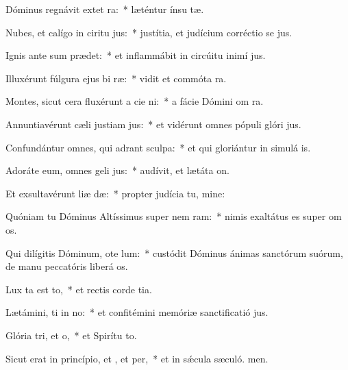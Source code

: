 \item Dóminus regnávit extet ra:~* læténtur ínsu tæ.
\item Nubes, et calígo in ciritu jus:~* justítia, et judícium corréctio se jus.
\item Ignis ante sum prædet:~* et inflammábit in circúitu inimí jus.
\item Illuxérunt fúlgura ejus bi ræ:~* vidit et commóta  ra.
\item Montes, sicut cera fluxérunt a cie ni:~* a fácie Dómini om ra.
\item Annuntiavérunt cæli justiam jus:~* et vidérunt omnes pópuli glóri jus.
\item Confundántur omnes, qui adrant sculpa:~* et qui gloriántur in simulá is.
\item Adoráte eum, omnes geli jus:~* audívit, et lætáta  on.
\item Et exsultavérunt liæ dæ:~* propter judícia tu, mine:
\item Quóniam tu Dóminus Altíssimus super nem ram:~* nimis exaltátus es super om os.
\item Qui dilígitis Dóminum, ote lum:~* custódit Dóminus ánimas sanctórum suórum, de manu peccatóris liberá os.
\item Lux ta est to,~* et rectis corde tia.
\item Lætámini, ti in no:~* et confitémini memóriæ sanctificatió jus.
\item Glória tri, et o,~* et Spirítu to.
\item Sicut erat in princípio, et , et per,~* et in sǽcula sæculó. men.

